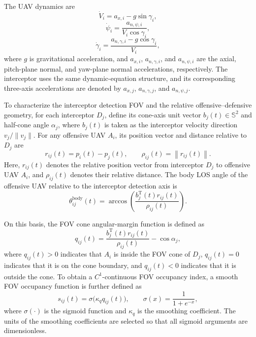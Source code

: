 \documentclass{cja}
\begin{document}
The UAV dynamics are
\begin{equation}
\dot V_i=a_{x,i}-g\sin\gamma_i,
\label{eq:dyn-V}
\end{equation}
\begin{equation}
\dot\psi_i=\frac{a_{n,\psi,i}}{V_i\cos\gamma_i},
\label{eq:dyn-psi}
\end{equation}
\begin{equation}
\dot\gamma_i=\frac{a_{n,\gamma,i}-g\cos\gamma_i}{V_i},
\label{eq:dyn-gamma}
\end{equation}
where $g$ is gravitational acceleration, and $a_{x,i}$, $a_{n,\gamma,i}$, and $a_{n,\psi,i}$ are the axial, pitch-plane normal, and yaw-plane normal accelerations, respectively. The interceptor uses the same dynamic-equation structure, and its corresponding three-axis accelerations are denoted by $a_{x,j}$, $a_{n,\gamma,j}$, and $a_{n,\psi,j}$.

To characterize the interceptor detection FOV and the relative offensive--defensive geometry, for each interceptor $D_j$, define its cone-axis unit vector $b_j(t)\in\mathbb S^2$ and half-cone angle $\alpha_j$, where $b_j(t)$ is taken as the interceptor velocity direction $v_j/\|v_j\|$. For any offensive UAV $A_i$, its position vector and distance relative to $D_j$ are
\begin{equation}
r_{ij}(t)=p_i(t)-p_j(t),\qquad
\rho_{ij}(t)=\left\|r_{ij}(t)\right\|.
\end{equation}
Here, $r_{ij}(t)$ denotes the relative position vector from interceptor $D_j$ to offensive UAV $A_i$, and $\rho_{ij}(t)$ denotes their relative distance. The body LOS angle of the offensive UAV relative to the interceptor detection axis is
\begin{equation}
\theta_{ij}^{\mathrm{body}}(t)
=
\arccos
\left(
\frac{b_j^{\mathrm T}(t)r_{ij}(t)}
{\rho_{ij}(t)}
\right).
\end{equation}

On this basis, the FOV cone angular-margin function is defined as
\begin{equation}
q_{ij}(t)
=
\frac{b_j^{\mathrm T}(t)r_{ij}(t)}
{\rho_{ij}(t)}
-\cos\alpha_j ,
\label{eq:qij-def}
\end{equation}
where $q_{ij}(t)>0$ indicates that $A_i$ is inside the FOV cone of $D_j$, $q_{ij}(t)=0$ indicates that it is on the cone boundary, and $q_{ij}(t)<0$ indicates that it is outside the cone. To obtain a $C^1$-continuous FOV occupancy index, a smooth FOV occupancy function is further defined as
\begin{equation}
s_{ij}(t)
=
\sigma\!\bigl(\kappa_q q_{ij}(t)\bigr),\qquad
\sigma(x)=\frac{1}{1+e^{-x}},
\label{eq:sij-def}
\end{equation}
where $\sigma(\cdot)$ is the sigmoid function and $\kappa_q$ is the smoothing coefficient.
The units of the smoothing coefficients are selected so that all sigmoid arguments are dimensionless.
\end{document}

